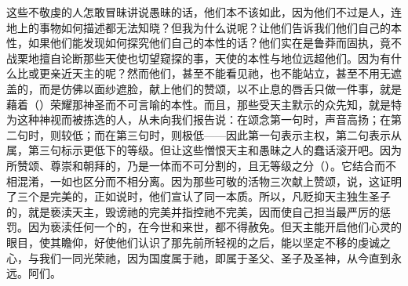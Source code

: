 这些不敬虔的人怎敢冒昧讲说愚昧的话，他们本不该如此，因为他们不过是人，连地上的事物如何描述都无法知晓？但我为什么说呢？让他们告诉我们他们自己的本性，如果他们能发现如何探究他们自己的本性的话？他们实在是鲁莽而固执，竟不战栗地擅自论断那些天使也切望窥探的事，天使的本性与地位远超他们。因为有什么比或更亲近天主的呢？然而他们，甚至不能看见祂，也不能站立，甚至不用无遮盖的，而是仿佛以面纱遮脸，献上他们的赞颂，以不止息的唇舌只做一件事，就是藉着（）荣耀那神圣而不可言喻的本性。而且，那些受天主默示的众先知，就是特为这种神视而被拣选的人，从未向我们报告说：在颂念第一句时，声音高扬；在第二句时，则较低；而在第三句时，则极低——因此第一句表示主权，第二句表示从属，第三句标示更低下的等级。但让这些憎恨天主和愚昧之人的蠢话滚开吧。因为所赞颂、尊崇和朝拜的，乃是一体而不可分割的，且无等级之分（）。它结合而不相混淆，一如也区分而不相分离。因为那些可敬的活物三次献上赞颂，说，这证明了三个是完美的，正如说时，他们宣认了同一本质。所以，凡贬抑天主独生圣子的，就是亵渎天主，毁谤祂的完美并指控祂不完美，因而使自己担当最严厉的惩罚。因为亵渎任何一个的，在今世和来世，都不得赦免。但天主能开启他们心灵的眼目，使其瞻仰，好使他们认识了那先前所轻视的之后，能以坚定不移的虔诚之心，与我们一同光荣祂，因为国度属于祂，即属于圣父、圣子及圣神，从今直到永远。阿们。\par

